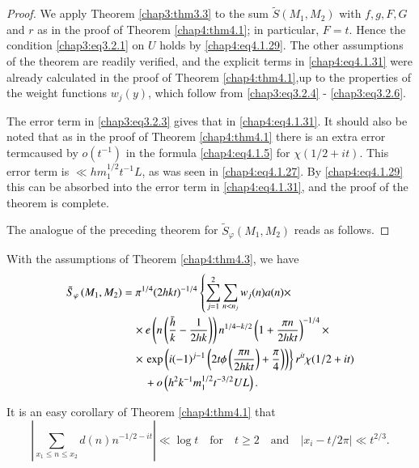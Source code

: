 \begin{proof}
We apply Theorem \ref{chap3:thm3.3} to the sum $\tilde{S}(M_1,M_2)$ with $f,g,F,G$ and $r$ as in the proof of Theorem \ref{chap4:thm4.1}; in particular, $F=t$. Hence the condition \eqref{chap3:eq3.2.1} on $U$ holds by \eqref{chap4:eq4.1.29}. The other assumptions of the theorem are readily verified, and the explicit terms in \eqref{chap4:eq4.1.31} were already calculated in the proof of Theorem \ref{chap4:thm4.1},up to the properties of the weight functions $w_j(y)$, which follow from \eqref{chap3:eq3.2.4} - \eqref{chap3:eq3.2.6}.

The error term in \eqref{chap3:eq3.2.3} gives that in
\eqref{chap4:eq4.1.31}. It should also be noted that as in the proof
of Theorem \ref{chap4:thm4.1} there is an extra error
term\pageoriginale caused by $o(t^{-1})$ in the formula
\eqref{chap4:eq4.1.5} for $\chi(1/2+it)$. This error term is $\ll
hm_1^{1/2}t^{-1}L$, as was seen in \eqref{chap4:eq4.1.27}. By
\eqref{chap4:eq4.1.29} this can be absorbed into the error term in
\eqref{chap4:eq4.1.31}, and the proof of the theorem is complete. 

The analogue of the preceding theorem for $\tilde{S}_\varphi(M_1,M_2)$ reads as follows.
\end{proof}

\begin{thm}\label{chap4:thm4.4}
With the assumptions of Theorem \ref{chap4:thm4.3}, we have 
\begin{align}
\tilde{S}_\varphi\left(M_1,M_2\right) &= \pi^{1/4}(2hkt)^{-1/4}\left\{ \sum\limits_{j=1}^2\sum\limits_{n<n_j}w_j(n)a(n) \times\right.\label{chap4:eq4.1.35}\\
&\quad \times e\left(n\left(\frac{\bar{h}}{k}-\frac{1}{2hk} \right)\right)n^{1/4-k /2}\left(1+\frac{\pi n}{2hkt}\right)^{-1/4} \times\notag\\
&\quad \times\left.\exp\left(i(-1)^{j-1}\left(2t\phi\left(\frac{\pi n} {2hkt}\right)+\frac{\pi}{4}\right)\right)\right\}r^{it}\chi (1/2+it)\notag\\
&\qquad +o\left(h^2k^{-1}m_1^{1/2}t^{-3/2}UL\right).\notag
\end{align}
\end{thm}

\begin{Remark}\label{chap4:rem1}
It is an easy corollary of Theorem \ref{chap4:thm4.1} that
\begin{equation}\label{chap4:eq4.1.36}
\left|\sum\limits_{x_1\leq n\leq x_2}d(n)n^{-1/2-it}\right|\ll\log
t\quad\text{for}\quad t\geq 2\quad\text{and}\quad\left|x_i-t/2\pi
\right|\ll t^{2/3}. 
\end{equation}
\end{Remark}

